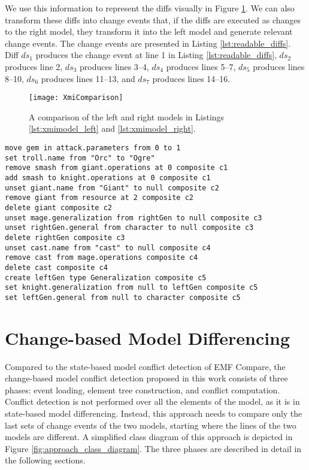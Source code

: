 We use this information to represent the diffs visually in Figure \ref{fig:xmi_comparison}. We can also transform these diffs into change events that, if the diffs are executed as changes to the right model, they transform it into the left model and generate relevant change events. The change events are presented in Listing \ref{lst:readable_diffs}. Diff $ds_{1}$ produces the change event at line 1 in Listing \ref{lst:readable_diffs}, $ds_{2}$ produces line 2, $ds_{3}$ produces lines 3–4, $ds_{4}$ produces lines 5–7, $ds_{5}$ produces lines 8–10, $ds_{6}$ produces lines 11–13, and $ds_{7}$ produces lines 14–16.

\begin{figure}[ht]
  \texttt{[image: XmiComparison]}
  \caption{A comparison of the left and right models in Listings \ref{lst:xmimodel_left} and \ref{lst:xmimodel_right}.}
  \label{fig:xmi_comparison}
\end{figure}

\vspace{-20pt}
\begin{lstlisting}[firstnumber=1,style=eol,caption={Diffs presented as change events.},label=lst:readable_diffs]
move gem in attack.parameters from 0 to 1
set troll.name from "Orc" to "Ogre"
remove smash from giant.operations at 0 composite c1
add smash to knight.operations at 0 composite c1
unset giant.name from "Giant" to null composite c2
remove giant from resource at 2 composite c2
delete giant composite c2
unset mage.generalization from rightGen to null composite c3
unset rightGen.general from character to null composite c3
delete rightGen composite c3
unset cast.name from "cast" to null composite c4
remove cast from mage.operations composite c4
delete cast composite c4
create leftGen type Generalization composite c5
set knight.generalization from null to leftGen composite c5
set leftGen.general from null to character composite c5
\end{lstlisting}

\section{Change-based Model Differencing}
\label{sec:change_based_approach_for_comparing_models}
Compared to the state-based model conflict detection of EMF Compare, the change-based model conflict detection proposed in this work consists of three phases: event loading, element tree construction, and conflict computation.
Conflict detection is not performed over all the elements of the model, as it is in state-based model differencing. Instead, this approach needs to compare only the last sets of change events of the two models, starting where the lines of the two models are different. A simplified class diagram of this approach \cite{epsilonlabs2019emfcbp} is depicted in Figure \ref{fig:approach_class_diagram}. The three phases are described in detail in the following sections.


